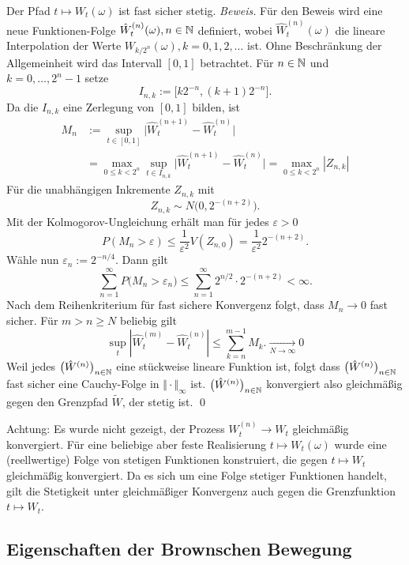 \begin{satz}
Der Pfad $t \mapsto W_t(\omega)$ ist fast sicher stetig.
\textit{Beweis.}
Für den Beweis wird eine neue Funktionen-Folge $\hat W_t^{(n)}(\omega), n \in \Bbb N$
definiert, wobei $\hat W_t^{(n)}(\omega)$ die lineare Interpolation der Werte $W_{k/2^n}(\omega), k=0,1,2,\ldots$ ist. 
Ohne Beschränkung der Allgemeinheit wird das Intervall $[0,1]$ betrachtet. Für $n \in \Bbb N$ und $k=0,\dots,2^n-1$ setze
$$I_{n,k}:=\big[k2^{-n},(k+1)2^{-n}\big].$$
Da die $I_{n,k}$ eine Zerlegung von $[0,1]$ bilden, ist
$$
\begin{aligned}
M_n &:=\sup_{t\in[0,1]}\big|\hat W^{(n+1)}_t-\hat W^{(n)}_t\big| 
\\ &= \max_{0\le k<2^n} \sup_{t\in I_{n,k}} \big|\hat W^{(n+1)}_t-\hat W^{(n)}_t\big| =\max_{0\le k<2^n}|Z_{n,k}|
\end{aligned}
$$
Für die unabhängigen Inkremente $Z_{n,k}$ mit
$$Z_{n,k}\sim N\!\big(0,2^{-(n+2)}\big).$$
Mit der Kolmogorov-Ungleichung erhält man für jedes $\varepsilon>0$
$$
P(M_n>\varepsilon) \le \frac{1}{\varepsilon^2} V(Z_{n,0}) = \frac{1}{\varepsilon^2} 2^{-(n+2)}.
$$
Wähle nun $\varepsilon_n:=2^{-n/4}$. Dann gilt
$$
\sum_{n=1}^\infty P\!\big(M_n>\varepsilon_n\big)
\le \sum_{n=1}^\infty 2^{n/2} \cdot 2^{-(n+2)}<\infty.
$$
Nach dem Reihenkriterium für fast sichere Konvergenz folgt, dass $M_n\to 0$ fast sicher.
Für $m \gt n \ge N$ beliebig gilt
$$\sup_{t}|\hat W^{(m)}_t - \hat W^{(n)}_t| \leq \sum_{k=n}^{m-1} M_k. \underset{N \to \infty} \longrightarrow 0$$
Weil jedes $\big(\hat W^{(n)}\big)_{n\in\Bbb N}$ eine stückweise lineare Funktion ist, folgt
dass $\big(\hat W^{(n)}\big)_{n\in\Bbb N}$ fast sicher eine Cauchy-Folge in $\Vert \cdot \Vert_{\infty}$ ist.
$\big(\hat W^{(n)}\big)_{n\in\Bbb N}$ konvergiert also gleichmäßig gegen den Grenzpfad $\widetilde W$, der stetig ist. \qed

Achtung: Es wurde nicht gezeigt, der Prozess $W_t^{(n)} \longrightarrow W_t$ gleichmäßig konvergiert. Für eine beliebige aber feste Realisierung
$t \mapsto W_t(\omega)$ wurde eine (reellwertige) Folge von stetigen Funktionen konstruiert, die gegen $t \mapsto W_t$ gleichmäßig konvergiert.
Da es sich um eine Folge stetiger Funktionen handelt, gilt die Stetigkeit unter gleichmäßiger Konvergenz auch gegen die Grenzfunktion $t \mapsto W_t$.
\end{satz}

\subsection{Eigenschaften der Brownschen Bewegung}

